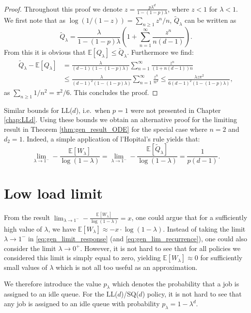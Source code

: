 \documentclass[12pt]{report}
\newcommand{\E}{\mathbb{E}}
\begin{document}
\begin{proof}
Throughout this proof we denote $z = \frac{p \lambda^d}{1-(1-p)\lambda}$, where $z < 1$ for $\lambda < 1$.
We first note that as $\log(1/(1-z))=\sum_{n\geq 1} z^n/n$, $\tilde{Q}_\lambda$ can be written as
$$
\tilde{Q}_\lambda
=
\frac{\lambda}{1-(1-p)\lambda} \left(1+ \sum_{n=1}^\infty \frac{z^n}{n(d-1)} \right).
$$
From this it is obvious that $\E[Q_\lambda] \leq \tilde{Q}_\lambda$. Furthermore we find:
\begin{align*}
\tilde Q_\lambda - \E[Q_\lambda]
&=
\frac{\lambda}{(d-1)(1-(1-p)\lambda)} \sum_{n=1}^{\infty} \frac{z^n}{(1+n(d-1))n}\\
&\leq \frac{\lambda}{(d-1)^2(1-(1-p)\lambda)} \sum_{n=1}^\infty \frac{z^n}{n^2}
\leq \frac{\lambda z \pi^2}{6(d-1)^2(1-(1-p)\lambda)},
\end{align*}
as $\sum_{n \geq 1} 1/n^2 = \pi^2/6$.
This concludes the proof.
\end{proof}

Similar bounds for  LL($d$), i.e.~when $p=1$ were not presented in Chapter \ref{chap:LLd}.
Using these bounds we obtain an alternative proof for the limiting result in Theorem \ref{thm:gen_result_ODE}
for the special case where $n=2$ and $d_2 = 1$. Indeed, a simple application of l'Hopital's rule yields that:
$$
\lim_{\lambda \rightarrow 1^-} - \frac{\E[W_\lambda]}{\log(1-\lambda)} 
= \lim_{\lambda \rightarrow 1^-} - \frac{\E[\tilde{Q}_\lambda]}{\log(1-\lambda)} 
= \frac{1}{p(d-1)}.
$$

\section{Low load limit} \label{sec:low_traffic}
From the result $\lim_{\lambda\rightarrow 1^-} -\frac{\E[W_\lambda]}{\log(1-\lambda)} = x$, one could argue that for a sufficiently high value of $\lambda$, we have $\E[W_\lambda] \approx - x \cdot \log(1-\lambda)$. Instead of taking the limit $\lambda \rightarrow 1^-$ in \eqref{eq:gen_limit_response} (and \eqref{eq:gen_lim_recurrence}), one could also consider the limit $\lambda \rightarrow 0^+$. However, it is not hard to see that for all policies we considered this limit is simply equal to zero, yielding $\E[W_\lambda] \approx 0$ for sufficiently small values of $\lambda$ which is not all too useful as an approximation. 

We therefore introduce the value $p_\lambda$ which denotes the probability that a job is assigned to an idle queue. For the LL($d$)/SQ($d$) policy, it is not hard to see that any job is assigned to an idle queue with probability $p_\lambda = 1-\lambda^d$.
\end{document}
